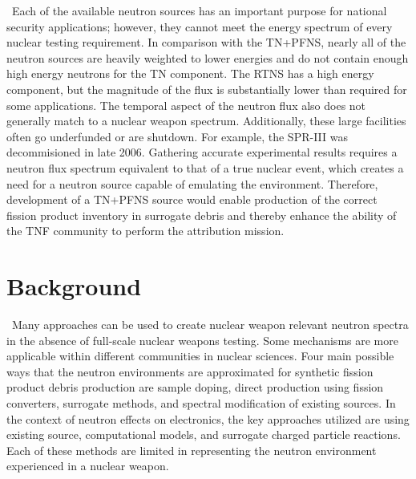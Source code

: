 \ Each of the available neutron sources has an important purpose for national security applications; however, they cannot meet the energy spectrum of every nuclear testing requirement. 
In comparison with the TN+PFNS, nearly all of the neutron sources are heavily weighted to lower energies and do not contain enough high energy neutrons for the TN component. 
The RTNS has a high energy component, but the magnitude of the flux is substantially lower than required for some applications. 
The temporal aspect of the neutron flux also does not generally match to a nuclear weapon spectrum. 
Additionally, these large facilities often go underfunded or are shutdown. 
For example, the SPR-III was decommisioned in late 2006. %
Gathering accurate experimental results requires a neutron flux spectrum equivalent to that of a true nuclear event, which creates a need for a neutron source capable of emulating the environment. 
Therefore, development of a TN+PFNS source would enable production of the correct fission product inventory in surrogate debris and thereby enhance the ability of the TNF community to perform the attribution mission. 


\section{Background}

\ Many approaches can be used to create nuclear weapon relevant neutron spectra in the absence of full-scale nuclear weapons testing. Some mechanisms are more applicable within different communities in nuclear sciences. Four main possible ways that the neutron environments are approximated for synthetic fission product debris production are sample doping, direct production using fission converters, surrogate methods, and spectral modification of existing sources\cite{Bevins}. In the context of neutron effects on electronics, the key approaches utilized are using existing source, computational models, and surrogate charged particle reactions. Each of these methods are limited in representing the neutron environment experienced in a nuclear weapon. 

